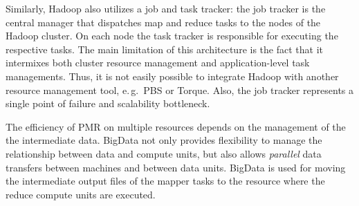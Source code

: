 \documentclass{acm_proc_article-sp}
\newcommand{\alnote}[1]{ {\textcolor{blue} { ***andreL: #1 }}}
\newcommand{\alnote}[1]{}
\newcommand{\pilotmapreduce}{Pilot-MapReduce\xspace}
\begin{document}
Similarly, Hadoop also utilizes a job and task tracker: the job
tracker is the central manager that dispatches map and reduce tasks to
the nodes of the Hadoop cluster. On each node the task tracker is
responsible for executing the respective tasks. The main limitation of
this architecture is the fact that it intermixes both cluster resource
management and application-level task managements. Thus, it is not
easily possible to integrate Hadoop with another resource management
tool, e.\,g.\ PBS or Torque. Also, the job tracker represents a single
point of failure and scalability bottleneck.


The efficiency of PMR  on multiple resources depends on
the management of the the intermediate data. BigData not only
provides flexibility to manage the relationship between data and
compute units, but also allows {\it parallel} data transfers between
machines and between data units.  BigData is used for moving the
intermediate output files of the mapper tasks to the resource where
the reduce compute units are executed. 


% 

\end{document}
